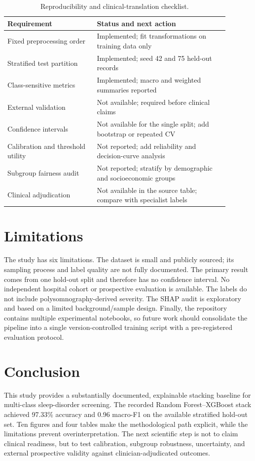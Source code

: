 ﻿\documentclass[preprint,12pt]{elsarticle}
\begin{document}
\begin{table}[t]
\centering
\caption{Reproducibility and clinical-translation checklist.}
\label{tab:checklist}
\small
\begin{tabular}{p{0.36\linewidth}p{0.53\linewidth}}
\toprule
Requirement & Status and next action \\
\midrule
Fixed preprocessing order & Implemented; fit transformations on training data only \\
Stratified test partition & Implemented; seed 42 and 75 held-out records \\
Class-sensitive metrics & Implemented; macro and weighted summaries reported \\
External validation & Not available; required before clinical claims \\
Confidence intervals & Not available for the single split; add bootstrap or repeated CV \\
Calibration and threshold utility & Not reported; add reliability and decision-curve analysis \\
Subgroup fairness audit & Not reported; stratify by demographic and socioeconomic groups \\
Clinical adjudication & Not available in the source table; compare with specialist labels \\
\bottomrule
\end{tabular}
\end{table}

\section{Limitations}
The study has six limitations. The dataset is small and publicly sourced; its sampling process and label quality are not fully documented. The primary result comes from one hold-out split and therefore has no confidence interval. No independent hospital cohort or prospective evaluation is available. The labels do not include polysomnography-derived severity. The SHAP audit is exploratory and based on a limited background/sample design. Finally, the repository contains multiple experimental notebooks, so future work should consolidate the pipeline into a single version-controlled training script with a pre-registered evaluation protocol.

\section{Conclusion}
This study provides a substantially documented, explainable stacking baseline for multi-class sleep-disorder screening. The recorded Random Forest--XGBoost stack achieved 97.33\% accuracy and 0.96 macro-F1 on the available stratified hold-out set. Ten figures and four tables make the methodological path explicit, while the limitations prevent overinterpretation. The next scientific step is not to claim clinical readiness, but to test calibration, subgroup robustness, uncertainty, and external prospective validity against clinician-adjudicated outcomes.
\end{document}
